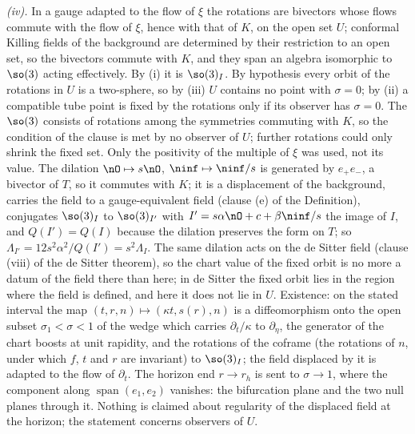 \emph{(iv).} In a gauge adapted to the flow of $\xi$ the rotations are bivectors whose flows commute with the flow of $\xi$, hence with that of $K$, on the open set $U$; conformal Killing fields of the background are determined by their restriction to an open set, so the bivectors commute with $K$, and they span an algebra isomorphic to $\so(3)$ acting effectively. By (i) it is $\so(3)_{I}$. By hypothesis every orbit of the rotations in $U$ is a two-sphere, so by (iii) $U$ contains no point with $\sigma = 0$; by (ii) a compatible tube point is fixed by the rotations only if its observer has $\sigma = 0$. The $\so(3)$ consists of rotations among the symmetries commuting with $K$, so the condition of the clause is met by no observer of $U$; further rotations could only shrink the fixed set. Only the positivity of the multiple of $\xi$ was used, not its value. The dilation $\nO \mapsto s\nO$, $\ninf \mapsto \ninf/s$ is generated by $e_{+}e_{-}$, a bivector of $T$, so it commutes with $K$; it is a displacement of the background, carries the field to a gauge-equivalent field (clause (e) of the Definition), conjugates $\so(3)_{I}$ to $\so(3)_{I'}$ with $I' = s\alpha\nO + c + \beta\ninf/s$ the image of $I$, and $Q(I') = Q(I)$ because the dilation preserves the form on $T$; so $\Lambda_{I'} = 12 s^{2}\alpha^{2}/Q(I') = s^{2}\Lambda_{I}$. The same dilation acts on the de Sitter field (clause (viii) of the de Sitter theorem), so the chart value of the fixed orbit is no more a datum of the field there than here; in de Sitter the fixed orbit lies in the region where the field is defined, and here it does not lie in $U$. Existence: on the stated interval the map $(t, r, n) \mapsto (\kappa t, s(r), n)$ is a diffeomorphism onto the open subset $\sigma_{1} < \sigma < 1$ of the wedge which carries $\partial_{t}/\kappa$ to $\partial_{\eta}$, the generator of the chart boosts at unit rapidity, and the rotations of the coframe (the rotations of $n$, under which $f$, $t$ and $r$ are invariant) to $\so(3)_{I}$; the field displaced by it is adapted to the flow of $\partial_{t}$. The horizon end $r \to r_{h}$ is sent to $\sigma \to 1$, where the component along $\operatorname{span}(e_{1}, e_{2})$ vanishes: the bifurcation plane and the two null planes through it. Nothing is claimed about regularity of the displaced field at the horizon; the statement concerns observers of $U$.

